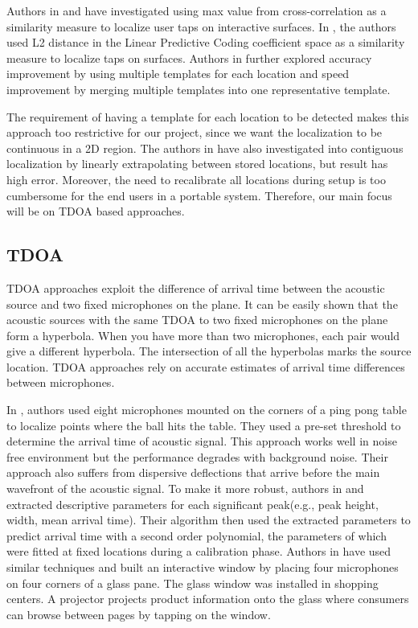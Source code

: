 Authors in \cite{extended:tusi} and \cite{ltm:pham} have investigated using max value from cross-correlation as a similarity measure to localize user taps on interactive surfaces. In \cite{ltm:lpc}, the authors used L2 distance in the Linear Predictive Coding coefficient space as a similarity measure to localize taps on surfaces. Authors in \cite{ltm:tusi2} further explored accuracy improvement by using multiple templates for each location and speed improvement by merging multiple templates into one representative template.

The requirement of having a template for each location to be detected makes this approach too restrictive for our project, since we want the localization to be continuous in a 2D region. The authors in \cite{ltm:tusi2} have also investigated into contiguous localization by linearly extrapolating between stored locations, but result has high error.  Moreover, the need to recalibrate all locations during setup is too cumbersome for the end users in a portable system. Therefore, our main focus will be on TDOA based approaches.

\subsection{TDOA}
TDOA approaches exploit the difference of arrival time between the acoustic source and two fixed microphones on the plane. It can be easily shown that the acoustic sources with the same TDOA to two fixed microphones on the plane form a hyperbola. When you have more than two microphones, each pair would give a different hyperbola. The intersection of all the hyperbolas marks the source location. TDOA approaches rely on accurate estimates of arrival time differences between microphones. 

In \cite{tdoa:ppp}, authors used eight microphones mounted on the corners of a ping pong table to localize points where the ball hits the table. They used a pre-set threshold to determine the arrival time of acoustic signal. This approach works well in noise free environment but the performance degrades with background noise. Their approach also suffers from dispersive deflections that arrive before the main wavefront of the acoustic signal. To make it more robust, authors in \cite{tdoa:mit3} and \cite{tdoa:mit4} extracted descriptive parameters for each significant peak(e.g., peak height, width, mean arrival time). Their algorithm then used the extracted parameters to predict arrival time with a second order polynomial, the parameters of which were fitted at fixed locations during a calibration phase. Authors in \cite{tdoa:mit5} have used similar techniques and built an interactive window by placing four microphones on four corners of a glass pane. The glass window was installed in shopping centers. A projector projects product information onto the glass where consumers can browse between pages by tapping on the window.

